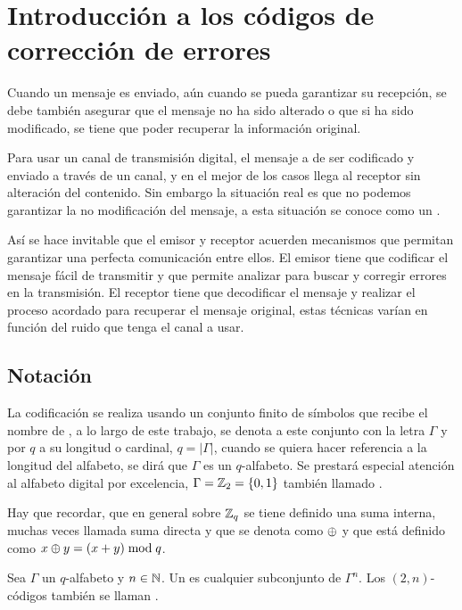 \section{Introducción a los códigos de corrección de errores}

Cuando un mensaje es enviado, aún cuando se pueda garantizar su recepción, se debe también asegurar que el mensaje no ha sido alterado o que si ha sido modificado, se tiene que poder recuperar la información original.

Para usar un canal de transmisión digital, el mensaje a de ser codificado y enviado a través de un canal, y en el mejor de los casos llega al receptor sin alteración del contenido.
Sin embargo la situación real es que no podemos garantizar la no modificación del mensaje, a esta situación se
conoce como un .

Así se hace invitable que el emisor y receptor acuerden mecanismos que permitan garantizar una perfecta comunicación entre ellos.
El emisor tiene que codificar el mensaje fácil de transmitir y que permite analizar para buscar y corregir errores en la transmisión.
El receptor tiene que decodificar el mensaje y realizar el proceso acordado para recuperar el mensaje original, estas técnicas varían en función del ruido que tenga el canal a usar.

\subsection{Notación}
La codificación se realiza usando un conjunto finito de símbolos que recibe el nombre de , a lo largo de este trabajo, se denota a este conjunto con la letra $\Gamma$ y por $q$ a su longitud o cardinal, $q=|\Gamma|$, cuando se quiera hacer referencia a la longitud del alfabeto, se dirá que $\Gamma$ es un $q$-alfabeto.
Se prestará especial atención al alfabeto digital por excelencia, $\Gamma = \mathbb{Z}_2 = \left\{0, 1\right\}$ también llamado .

Hay que recordar, que en general sobre $\mathbb{Z}_q$ se tiene definido una suma interna, muchas veces llamada suma directa y que se denota como $\oplus$ y que está definido como $x\oplus y = (x+y)\bmod q$.

\begin{definition}
	Sea $\Gamma$ un $q$-alfabeto y $n\in\mathbb{N}$.
	Un  es cualquier subconjunto de $\Gamma^n$.
	Los $(2, n)$-códigos también se llaman .
\end{definition}

